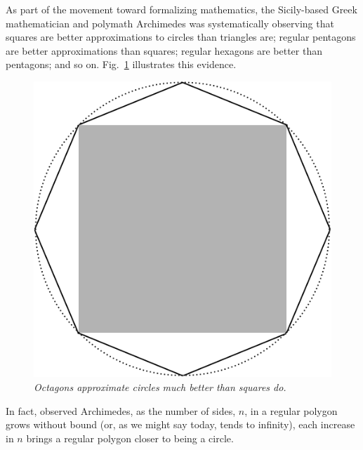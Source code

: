 As part of the movement toward formalizing mathematics, the Sicily-based Greek mathematician and polymath Archimedes was systematically observing that squares are better approximations to circles than triangles are; regular pentagons are better approximations than squares; regular hexagons are better than pentagons; and so on.  Fig.~\ref{fig:approxcircle} illustrates this evidence.
\begin{figure}[htb]
\begin{center}
       \includegraphics[scale=0.25]{FiguresArithmetic/ApproxCircle}
\caption{{\it Octagons approximate circles much better than squares do.}
\label{fig:approxcircle}}
\end{center}
\end{figure}
In fact, observed Archimedes, as the number of sides, $n$, in a regular polygon grows without bound (or, as we might say today, tends to infinity), each increase in $n$ brings a regular polygon closer to being a circle.

\medskip



